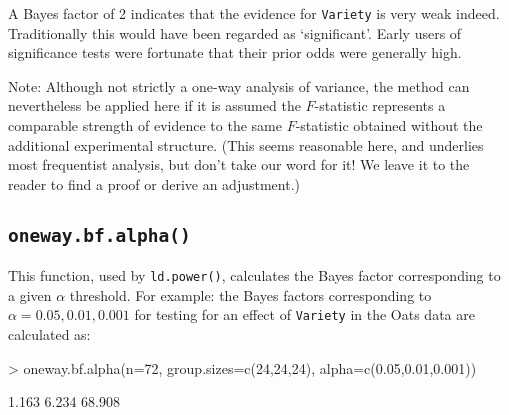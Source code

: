 \documentclass[a4paper,10pt]{amsart}
\begin{document}
A Bayes factor of 2 indicates that the evidence for \texttt{Variety}
is very weak indeed. Traditionally this would have been regarded as
`significant'. Early users of significance tests were fortunate that
their prior odds were generally high.

Note: Although not strictly a one-way analysis of variance, the method
can nevertheless be applied here if it is assumed the $F$-statistic
represents a comparable strength of evidence to the same $F$-statistic
obtained without the additional experimental structure. (This seems
reasonable here, and underlies most frequentist analysis, but don't
take our word for it! We leave it to the reader to find a proof or
derive an adjustment.)

\subsection{\texttt{oneway.bf.alpha()}}
This function, used by \texttt{ld.power()}, calculates the \cite{SpiegelhalterSmith82} 
Bayes factor corresponding to a given $\alpha$ threshold.
For example: the Bayes factors corresponding to $\alpha = 0.05,0.01,0.001$ for testing
for an effect of \texttt{Variety} in the Oats data are calculated as:
\begin{Schunk}
\begin{Sinput}
> oneway.bf.alpha(n=72, group.sizes=c(24,24,24), alpha=c(0.05,0.01,0.001))
\end{Sinput}
\begin{Soutput}
[1]  1.163  6.234 68.908
\end{Soutput}
\end{Schunk}
\end{document}

